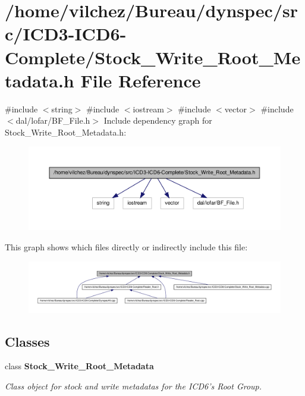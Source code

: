 \section{/home/vilchez/\-Bureau/dynspec/src/\-I\-C\-D3-\/\-I\-C\-D6-\/\-Complete/\-Stock\-\_\-\-Write\-\_\-\-Root\-\_\-\-Metadata.h \-File \-Reference}
\label{_stock___write___root___metadata_8h}
{\ttfamily \#include $<$string$>$}\*
{\ttfamily \#include $<$iostream$>$}\*
{\ttfamily \#include $<$vector$>$}\*
{\ttfamily \#include $<$dal/lofar/\-B\-F\-\_\-\-File.\-h$>$}\*
\-Include dependency graph for \-Stock\-\_\-\-Write\-\_\-\-Root\-\_\-\-Metadata.\-h\-:\nopagebreak
\begin{figure}[H]
\begin{center}
\leavevmode
\includegraphics[width=350pt]{_stock___write___root___metadata_8h__incl}
\end{center}
\end{figure}
\-This graph shows which files directly or indirectly include this file\-:\nopagebreak
\begin{figure}[H]
\begin{center}
\leavevmode
\includegraphics[width=350pt]{_stock___write___root___metadata_8h__dep__incl}
\end{center}
\end{figure}
\subsection*{\-Classes}
\begin{DoxyCompactItemize}
\item 
class {\bf \-Stock\-\_\-\-Write\-\_\-\-Root\-\_\-\-Metadata}
\begin{DoxyCompactList}\small\item\em \-Class object for stock and write metadatas for the \-I\-C\-D6's \-Root \-Group. \end{DoxyCompactList}\end{DoxyCompactItemize}
